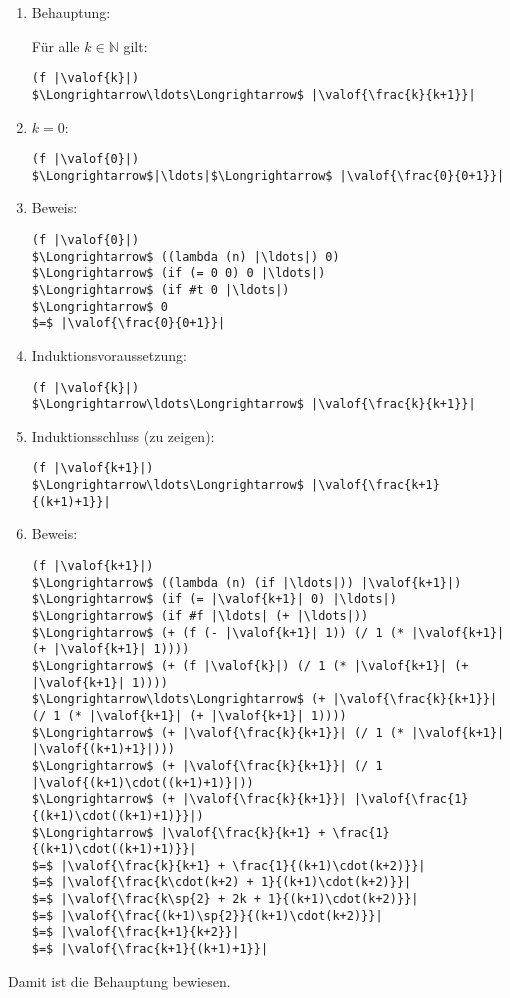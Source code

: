 \begin{enumerate}
\item Behauptung:

  Für alle $k\in\mathbb{N}$ gilt:

\begin{lstlisting}
(f |\valof{k}|)
$\Longrightarrow\ldots\Longrightarrow$ |\valof{\frac{k}{k+1}}|
\end{lstlisting}

\item $k=0$:
%
\begin{lstlisting}
(f |\valof{0}|)
$\Longrightarrow$|\ldots|$\Longrightarrow$ |\valof{\frac{0}{0+1}}|
\end{lstlisting}

\item Beweis:
\begin{lstlisting}
(f |\valof{0}|)
$\Longrightarrow$ ((lambda (n) |\ldots|) 0)
$\Longrightarrow$ (if (= 0 0) 0 |\ldots|)
$\Longrightarrow$ (if #t 0 |\ldots|)
$\Longrightarrow$ 0
$=$ |\valof{\frac{0}{0+1}}|
\end{lstlisting}
%
\item Induktionsvoraussetzung:

\begin{lstlisting}
(f |\valof{k}|)
$\Longrightarrow\ldots\Longrightarrow$ |\valof{\frac{k}{k+1}}|
\end{lstlisting}

\item
Induktionsschluss (zu zeigen):
%
\begin{lstlisting}
(f |\valof{k+1}|)
$\Longrightarrow\ldots\Longrightarrow$ |\valof{\frac{k+1}{(k+1)+1}}|
\end{lstlisting}
%
\item Beweis:
\begin{lstlisting}
(f |\valof{k+1}|)
$\Longrightarrow$ ((lambda (n) (if |\ldots|)) |\valof{k+1}|)
$\Longrightarrow$ (if (= |\valof{k+1}| 0) |\ldots|)
$\Longrightarrow$ (if #f |\ldots| (+ |\ldots|))
$\Longrightarrow$ (+ (f (- |\valof{k+1}| 1)) (/ 1 (* |\valof{k+1}| (+ |\valof{k+1}| 1))))
$\Longrightarrow$ (+ (f |\valof{k}|) (/ 1 (* |\valof{k+1}| (+ |\valof{k+1}| 1))))
$\Longrightarrow\ldots\Longrightarrow$ (+ |\valof{\frac{k}{k+1}}| (/ 1 (* |\valof{k+1}| (+ |\valof{k+1}| 1))))
$\Longrightarrow$ (+ |\valof{\frac{k}{k+1}}| (/ 1 (* |\valof{k+1}| |\valof{(k+1)+1}|)))
$\Longrightarrow$ (+ |\valof{\frac{k}{k+1}}| (/ 1 |\valof{(k+1)\cdot((k+1)+1)}|))
$\Longrightarrow$ (+ |\valof{\frac{k}{k+1}}| |\valof{\frac{1}{(k+1)\cdot((k+1)+1)}}|)
$\Longrightarrow$ |\valof{\frac{k}{k+1} + \frac{1}{(k+1)\cdot((k+1)+1)}}|
$=$ |\valof{\frac{k}{k+1} + \frac{1}{(k+1)\cdot(k+2)}}|
$=$ |\valof{\frac{k\cdot(k+2) + 1}{(k+1)\cdot(k+2)}}|
$=$ |\valof{\frac{k\sp{2} + 2k + 1}{(k+1)\cdot(k+2)}}|
$=$ |\valof{\frac{(k+1)\sp{2}}{(k+1)\cdot(k+2)}}|
$=$ |\valof{\frac{k+1}{k+2}}|
$=$ |\valof{\frac{k+1}{(k+1)+1}}|
\end{lstlisting}
%
\end{enumerate}
Damit ist die Behauptung bewiesen.

